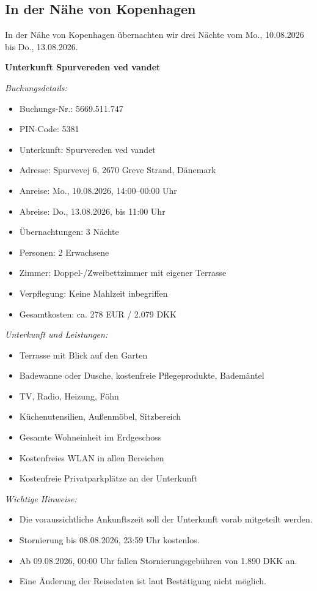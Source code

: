 \documentclass[a4paper,12pt]{article}
\begin{document}
\subsection{In der Nähe von Kopenhagen}

In der Nähe von Kopenhagen übernachten wir drei Nächte vom Mo., 10.08.2026 bis Do., 13.08.2026.

\textbf{Unterkunft Spurvereden ved vandet}

\textit{Buchungsdetails:}
\begin{itemize}
\item Buchungs-Nr.: 5669.511.747
\item PIN-Code: 5381
\item Unterkunft: Spurvereden ved vandet
\item Adresse: Spurvevej 6, 2670 Greve Strand, Dänemark
\item Anreise: Mo., 10.08.2026, 14:00--00:00 Uhr
\item Abreise: Do., 13.08.2026, bis 11:00 Uhr
\item Übernachtungen: 3 Nächte
\item Personen: 2 Erwachsene
\item Zimmer: Doppel-/Zweibettzimmer mit eigener Terrasse
\item Verpflegung: Keine Mahlzeit inbegriffen
\item Gesamtkosten: ca. 278 EUR / 2.079 DKK
\end{itemize}

\textit{Unterkunft und Leistungen:}
\begin{itemize}
\item Terrasse mit Blick auf den Garten
\item Badewanne oder Dusche, kostenfreie Pflegeprodukte, Bademäntel
\item TV, Radio, Heizung, Föhn
\item Küchenutensilien, Außenmöbel, Sitzbereich
\item Gesamte Wohneinheit im Erdgeschoss
\item Kostenfreies WLAN in allen Bereichen
\item Kostenfreie Privatparkplätze an der Unterkunft
\end{itemize}

\textit{Wichtige Hinweise:}
\begin{itemize}
\item Die voraussichtliche Ankunftszeit soll der Unterkunft vorab mitgeteilt werden.
\item Stornierung bis 08.08.2026, 23:59 Uhr kostenlos.
\item Ab 09.08.2026, 00:00 Uhr fallen Stornierungsgebühren von 1.890 DKK an.
\item Eine Änderung der Reisedaten ist laut Bestätigung nicht möglich.
\end{itemize}
\end{document}
